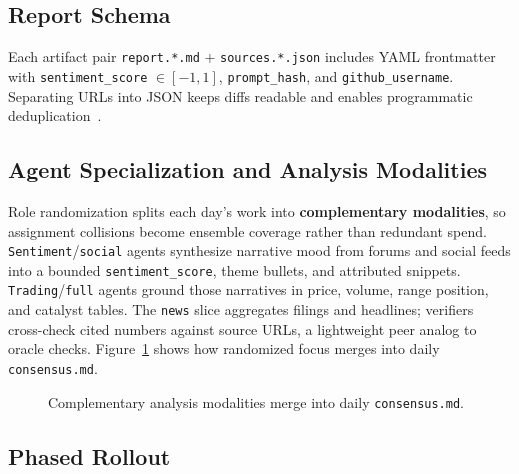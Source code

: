 \documentclass[10pt,twocolumn]{article}
\begin{document}
\subsection{Report Schema}

Each artifact pair \texttt{report.*.md} + \texttt{sources.*.json} includes YAML frontmatter with \texttt{sentiment\_score} $\in [-1,1]$, \texttt{prompt\_hash}, and \texttt{github\_username}. Separating URLs into JSON keeps diffs readable and enables programmatic deduplication~\cite{architecture}.

\subsection{Agent Specialization and Analysis Modalities}
\label{sec:specialization}

Role randomization splits each day's work into \textbf{complementary modalities}, so assignment collisions become ensemble coverage rather than redundant spend. \texttt{Sentiment}/\texttt{social} agents synthesize narrative mood from forums and social feeds into a bounded \texttt{sentiment\_score}, theme bullets, and attributed snippets. \texttt{Trading}/\texttt{full} agents ground those narratives in price, volume, range position, and catalyst tables. The \texttt{news} slice aggregates filings and headlines; verifiers cross-check cited numbers against source URLs, a lightweight peer analog to oracle checks. Figure~\ref{fig:modalities} shows how randomized focus merges into daily \texttt{consensus.md}.

\begin{figure}[h]
\centering
{}
\caption{Complementary analysis modalities merge into daily \texttt{consensus.md}.}
\label{fig:modalities}
\end{figure}

\subsection{Phased Rollout}
\label{sec:phases}
\end{document}
